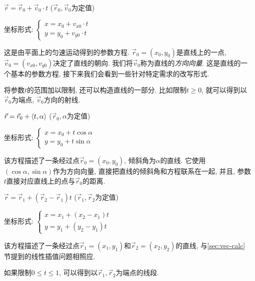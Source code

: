 \hlinefill

\noindent $\vec r=\vec r_0+\vec v_0\cdot t$
($\vec r_0,\vec v_0$为定值)

\noindent 坐标形式: $\begin{cases}
    x=x_0+v_{x0}\cdot t \\ y=y_0+v_{y0}\cdot t
  \end{cases}$

这是由平面上的匀速运动得到的参数方程.
$\vec r_0=(x_0,y_0)$是直线上的一点,
$\vec v_0=(v_{x0},v_{y0})$决定了直线的朝向.
我们将$\vec v_0$称为直线的\emph{方向向量}.
这是直线的一个基本的参数方程, 接下来我们会看到一些针对特定需求的改写形式.

将参数$t$的范围加以限制, 还可以构造直线的一部分.
比如限制$t\ge0$, 就可以得到以$\vec r_0$为端点,
$\vec v_0$方向的射线.

\hlinefill

\noindent $\vec r=\vec r_0+\braket{t,\alpha}$
($\vec r_0,\alpha$为定值)

\noindent 坐标形式: $\begin{cases}
    x=x_0+t\cos\alpha \\ y=y_0+t\sin\alpha
  \end{cases}$

该方程描述了一条经过点$\vec r_0=(x_0,y_0)$, 倾斜角为$\alpha$的直线.
它使用$(\cos\alpha,\sin\alpha)$作为方向向量,
直接把直线的倾斜角和方程联系在一起,
并且, 参数$t$直接对应直线上的点与$\vec r_0$的距离.

\begin{center}
\end{center}

\hlinefill

\noindent $\vec r=\vec r_1+(\vec r_2-\vec r_1)t$
($\vec r_1,\vec r_2$为定值)

\noindent 坐标形式: $\begin{cases}
    x=x_1+(x_2-x_1)t \\ y=y_1+(y_2-y_1)t
  \end{cases}$

该方程描述了一条经过点$\vec r_1=(x_1,y_1)$和$\vec r_2=(x_2,y_2)$的直线,
与\ref{sec:vec-calc}节提到的线性插值问题相照应.

如果限制$0\le{t}\le1$, 可以得到以$\vec r_1,\vec r_2$为端点的线段.


